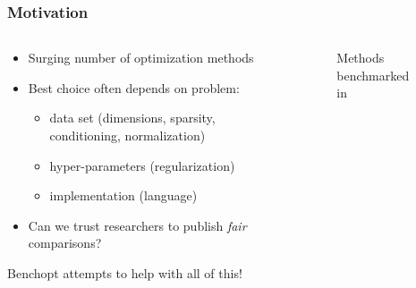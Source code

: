 \documentclass[10pt]{beamer}
\begin{document}
\begin{frame}
  \frametitle{Motivation}
  \begin{columns}[c]
    \begin{column}{0.45\textwidth}
      \begin{itemize}
        \item Surging number of optimization methods
        \item Best choice often depends on problem:
              \begin{itemize}
                \item data set (dimensions, sparsity, conditioning, normalization)
                \item hyper-parameters (regularization)
                \item implementation (language)
              \end{itemize}
        \item Can we trust researchers to publish \emph{fair} comparisons?
      \end{itemize}

      \medskip

      Benchopt attempts to help with all of this!
    \end{column}
    \begin{column}{0.45\textwidth}
      \begin{figure}[htpb]
        \centering
        \caption{%
          Methods benchmarked in \textcite{schmidt2021}
        }
      \end{figure}

    \end{column}
  \end{columns}
\end{frame}
\end{document}
